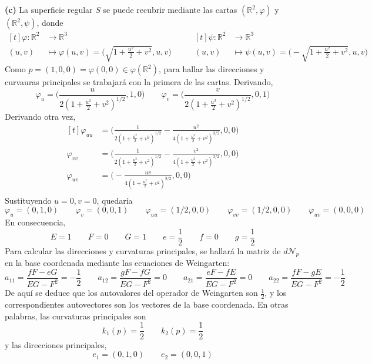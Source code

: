 \documentclass[12pt]{report}
\newcommand{\R}{\mathbb R}
\begin{document}
\vspace{2mm}
\noindent \textbf{(c)} La superficie regular $S$ se puede recubrir mediante las cartas $(\R^2,\varphi)$ y $(\R^2,\psi)$, donde
\[
\begin{aligned}[t]
\varphi \colon \R^2 &\longrightarrow \R^3 \\
(u,v) & \longmapsto \varphi(u,v) = \biggl(\sqrt{1+\frac{u^2}{2}+v^2}, u,v\biggr)
\end{aligned} \qquad  \begin{aligned}[t]
\psi \colon \R^2 &\longrightarrow \R^3 \\
(u,v) & \longmapsto \psi(u,v) = \biggl(-\sqrt{1+\frac{u^2}{2}+v^2}, u,v\biggr)
\end{aligned}
\]
Como $p = (1,0,0) = \varphi(0,0) \in \varphi(\R^2)$, para hallar las direcciones y curvauras principales se trabajará con la primera de las cartas. Derivando,
\[\varphi_u = \biggl(\frac{u}{2(1+\frac{u^2}{2}+v^2)^{1/2}} ,1,0 \biggr) \qquad \varphi_v = \biggl(\frac{v}{2(1+\frac{u^2}{2}+v^2)^{1/2}},0,1 \biggr)\]
Derivando otra vez, 
\[
\begin{aligned}[t]
\varphi_{uu} &= \biggl( \frac{1}{2(1+\frac{u^2}{2}+v^2)^{1/2}}-\frac{u^2}{4(1+\frac{u^2}{2}+v^2)^{3/2}},0,0\biggr) \\
\varphi_{vv} &= \biggl( \frac{1}{2(1+\frac{u^2}{2}+v^2)^{1/2}}-\frac{v^2}{4(1+\frac{u^2}{2}+v^2)^{3/2}},0,0\biggr) \\
\varphi_{uv} &= \biggl(-\frac{uv}{4(1+\frac{u^2}{2}+v^2)^{3/2}},0,0\biggr) \\
\end{aligned}
\]
Sustituyendo $u = 0, v =0$, quedaría
\[\varphi_u = (0,1,0) \qquad \varphi_v=(0,0,1) \qquad \varphi_{uu} = (1/2,0,0) \qquad \varphi_{vv} = (1/2,0,0) \qquad \varphi_{uv} = (0,0,0)\]
En consecuencia,
\[E = 1 \qquad F = 0 \qquad G = 1 \qquad e = \frac{1}{2} \qquad f = 0 \qquad g = \frac{1}{2}\]
Para calcular las direcciones y curvaturas principales, se hallará la matriz de $d\mathcal{N}_p$ en la base coordenada mediante las ecuaciones de Weingarten:
\[
a_{11} = \frac{fF-eG}{EG-F^2} = -\frac{1}{2} \qquad
a_{12} = \frac{gF-fG}{EG-F^2} = 0 \qquad
a_{21} = \frac{eF-fE}{EG-F^2} = 0 \qquad
a_{22} = \frac{fF-gE}{EG-F^2} = -\frac{1}{2}
\]
De aquí se deduce que los autovalores del operador de Weingarten son $\frac{1}{2}$, y los correspondientes autovectores son los vectores de la base coordenada. En otras palabras, las curvaturas principales son
\[k_1(p)=\frac{1}{2} \qquad k_2(p) = \frac{1}{2}\]
y las direcciones principales,
\[e_1 = (0,1,0) \qquad e_2 = (0,0,1)\]
\end{document}
